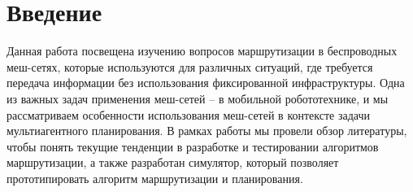 \documentclass[%
]{report}
\begin{document}






\chapter{Введение}
\label{sec:intro}

Данная работа посвещена изучению вопросов маршрутизации в беспроводных меш-сетях,
которые используются для различных ситуаций, где требуется передача информации без использования фиксированной инфраструктуры.
Одна из важных задач применения меш-сетей -- в мобильной робототехнике,
и мы рассматриваем особенности использования меш-сетей в контексте задачи мультиагентного планирования.
В рамках работы мы провели обзор литературы, чтобы понять текущие тенденции в разработке и тестировании
алгоритмов маршрутизации,
а также разработан симулятор,
который позволяет прототипировать алгоритм маршрутизации и планирования.
\end{document}
